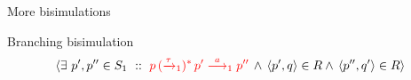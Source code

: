 \documentclass{beamer}
\begin{document}
\begin{slide}{More bisimulations}
\begin{block}{Branching bisimulation}
\begin{align*}
\rcb{\exists}{p',p'' \in S_1}{}{\rdb{p \,(\trans{\tau}_1)^{*}\,p' \tran{a}_1  p''}\, \e\,
    \pair{p',q} \in R \e\,
    \pair{p'',q'} \in R}
\end{align*}
\end{block}
\end{slide}

%
%  
%  
%  
%
%
%
%  
%
\end{document}
